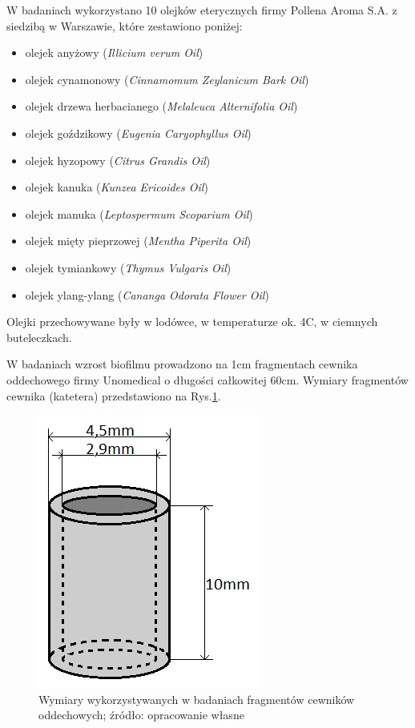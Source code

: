 \documentclass[11pt,a4paper]{report}
\begin{document}
W badaniach wykorzystano 10 olejków eterycznych  firmy Pollena Aroma S.A. z siedzibą w Warszawie, które zestawiono poniżej:
\begin{itemize}
\item olejek anyżowy (\textit{Illicium verum Oil})
\item olejek cynamonowy (\textit{Cinnamomum Zeylanicum Bark Oil})
\item olejek drzewa herbacianego (\textit{Melaleuca Alternifolia Oil})
\item olejek goździkowy (\textit{Eugenia Caryophyllus Oil})
\item olejek hyzopowy (\textit{Citrus Grandis Oil})
\item olejek kanuka (\textit{Kunzea Ericoides Oil})
\item olejek manuka (\textit{Leptospermum Scoparium Oil})
\item olejek mięty pieprzowej (\textit{Mentha Piperita Oil})
\item olejek tymiankowy (\textit{Thymus Vulgaris Oil})
\item olejek ylang-ylang (\textit{Cananga Odorata Flower Oil})\\
\end{itemize}
Olejki przechowywane były w lodówce, w temperaturze ok. 4\degree C, w ciemnych buteleczkach.
\clearpage

W badaniach wzrost biofilmu prowadzono na 1cm fragmentach cewnika oddechowego firmy Unomedical o długości całkowitej 60cm. Wymiary fragmentów cewnika (katetera) przedstawiono na Rys.\ref{stent}.\
\begin{figure}[!h]
\begin{center}
\includegraphics[scale=0.6]{img/stent.png}
\caption{Wymiary wykorzystywanych w badaniach fragmentów cewników oddechowych; źródło: opracowanie własne}\label{stent}
\end{center} 
\end{figure}
\end{document}
